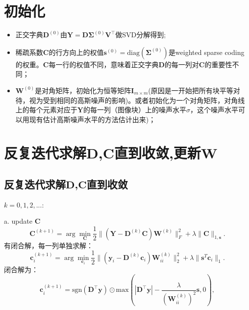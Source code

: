 \documentclass[10pt,twocolumn,letterpaper]{article}
\begin{document}
\section{初始化}
\begin{itemize}
\item 正交字典$\mathbf{D}^{(0)}$由$\mathbf{Y}=\mathbf{D}\mathbf{\Sigma}^{(0)}\mathbf{V}^{\top}$做SVD分解得到;
\item 稀疏系数$\mathbf{C}$的行方向上的权值$\mathbf{s}^{(0)}=\text{diag}(\mathbf{\Sigma}^{(0)})$是weighted sparse coding的权重。$\mathbf{C}$每一行的权值不同，意味着正交字典$\mathbf{D}$的每一列对$\mathbf{C}$的重要性不同；
\item $\mathbf{W}^{(0)}$是对角矩阵，初始化为恒等矩阵$\mathbf{I}_{m\times m}$(原因是一开始把所有块平等对待，视为受到相同的高斯噪声的影响)。或者初始化为一个对角矩阵，对角线上的每个元素对应于$\mathbf{Y}$的每一列（图像块）上的噪声水平$\sigma$，这个噪声水平可以用现有估计高斯噪声水平的方法估计出来)；
\end{itemize}


\section{反复迭代求解$\mathbf{D}$,$\mathbf{C}$直到收敛,更新$\mathbf{W}$ }
\subsection{反复迭代求解$\mathbf{D}$,$\mathbf{C}$直到收敛}
$k=0,1,2,...$:

a. update $\mathbf{C}$
\begin{equation}
\mathbf{C}^{(k+1)}
=
\arg\min_{\mathbf{C}}\frac{1}{2}\|(\mathbf{Y}-\mathbf{D}^{(k)}\mathbf{C})\mathbf{W}^{(k)}\|_{F}^{2}
+
\lambda\|\mathbf{C}\|_{1,\mathbf{s}}.
\end{equation}
有闭合解，每一列单独求解：
\begin{equation}
\mathbf{c}_{i}^{(k+1)}
=
\arg\min_{\mathbf{c}_{i}}\frac{1}{2}\|(\mathbf{y}_{i}-\mathbf{D}^{(k)}\mathbf{c}_{i})\mathbf{W}_{ii}^{(k)}\|_{2}^{2}
+
\lambda\|\mathbf{s}^{T}\mathbf{c}_{i}\|_{1}.
\end{equation}
闭合解为：
\begin{equation}
\mathbf{c}_{i}^{(k+1)} 
=
\text{sgn}(\mathbf{D^{\top}y}) 
\odot 
\text{max}(|\mathbf{D^{\top}y}|-\frac{\lambda}{(\mathbf{W}_{ii}^{(k)})^{2}}\mathbf{s},0),
\end{equation}
\end{document}
